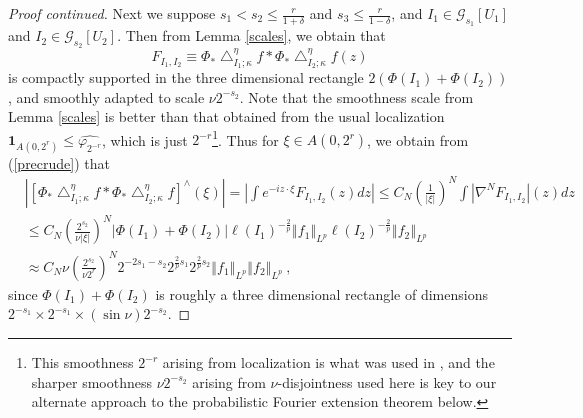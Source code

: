 \documentclass{amsart}%
\theoremstyle{plain}
\numberwithin{equation}{section}
\begin{document}
\begin{proof}
[Proof continued]Next we suppose $s_{1}<s_{2}\leq\frac{r}{1+\delta}$ and
$s_{3}\leq\frac{r}{1-\delta}$, and $I_{1}\in\mathcal{G}_{s_{1}}\left[
U_{1}\right]  $ and $I_{2}\in\mathcal{G}_{s_{2}}\left[  U_{2}\right]  $. Then
from Lemma \ref{scales}, we obtain that%
\[
F_{I_{1},I_{2}}\equiv\Phi_{\ast}\bigtriangleup_{I_{1};\kappa}^{\eta}f\ast
\Phi_{\ast}\bigtriangleup_{I_{2};\kappa}^{\eta}f\left(  z\right)
\]
is compactly supported in the three dimensional rectangle $2\left(
\Phi\left(  I_{1}\right)  +\Phi\left(  I_{2}\right)  \right)  $, and smoothly
adapted to scale $\nu2^{-s_{2}}$. Note that the smoothness scale from Lemma
\ref{scales} is better than that obtained from the usual localization
$\mathbf{1}_{A\left(  0,2^{r}\right)  }\leq\widehat{\varphi_{2^{-r}}}$, which
is just $2^{-r}$\footnote{This smoothness $2^{-r}$ arising from localization
is what was used in \cite{Saw7}, and the sharper smoothness $\nu2^{-s_{2}}$
arising from $\nu$-disjointness used here is key to our alternate approach to
the probabilistic Fourier extension theorem below.}. Thus for $\xi\in A\left(
0,2^{r}\right)  $, we obtain from (\ref{precrude}) that%
\begin{align*}
&  \left\vert \left[  \Phi_{\ast}\bigtriangleup_{I_{1};\kappa}^{\eta}f\ast
\Phi_{\ast}\bigtriangleup_{I_{2};\kappa}^{\eta}f\right]  ^{\wedge}\left(
\xi\right)  \right\vert =\left\vert \int e^{-iz\cdot\xi}F_{I_{1},I_{2}}\left(
z\right)  dz\right\vert \leq C_{N}\left(  \frac{1}{\left\vert \xi\right\vert
}\right)  ^{N}\int\left\vert \nabla^{N}F_{I_{1},I_{2}}\right\vert \left(
z\right)  dz\\
&  \leq C_{N}\left(  \frac{2^{s_{2}}}{\nu\left\vert \xi\right\vert }\right)
^{N}\left\vert \Phi\left(  I_{1}\right)  +\Phi\left(  I_{2}\right)
\right\vert \ell\left(  I_{1}\right)  ^{-\frac{2}{p}}\left\Vert f_{1}%
\right\Vert _{L^{p}}\ell\left(  I_{2}\right)  ^{-\frac{2}{p}}\left\Vert
f_{2}\right\Vert _{L^{p}}\\
&  \approx C_{N}\nu\left(  \frac{2^{s_{2}}}{\nu2^{r}}\right)  ^{N}%
2^{-2s_{1}-s_{2}}2^{\frac{2}{p}s_{1}}2^{\frac{2}{p}s_{2}}\left\Vert
f_{1}\right\Vert _{L^{p}}\left\Vert f_{2}\right\Vert _{L^{p}}\ ,
\end{align*}
since $\Phi\left(  I_{1}\right)  +\Phi\left(  I_{2}\right)  $ is roughly a
three dimensional rectangle of dimensions $2^{-s_{1}}\times2^{-s_{1}}%
\times\left(  \sin\nu\right)  2^{-s_{2}}$.


\end{proof}
\end{document}
